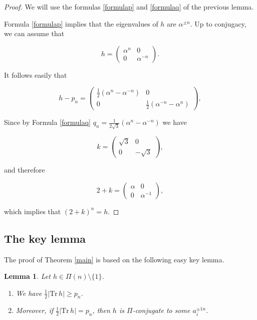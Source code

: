 \documentclass[12pt]{amsart}
\newcommand{\Tr}{{\mathrm {Tr}}}
\newtheorem{lemma}{Lemma}
\begin{document}
\begin{proof}  We will use the formulas 
\ref{formulap}  and \ref{formulaq}  of the previous lemma. 

Formula \ref{formulap} implies that  the eigenvalues of $h$ are $\alpha^{\pm n}$.
Up to conjugacy, we can assume that


$$h=\begin{pmatrix}
\alpha^n & 0\\
0 &\alpha^{-n}
\end{pmatrix}.$$



It follows easily that 

$$h-p_n=\begin{pmatrix}
\frac{1}{2}(\alpha^n-\alpha^{-n}) & 0\\
0 &\frac{1}{2}(\alpha^{-n}-\alpha^n)
\end{pmatrix},$$

Since by Formula \ref{formulaq}
$q_n= \frac{1}{2\sqrt{3}}(\alpha^{n}-\alpha^{-n})$
we have


$$k=\begin{pmatrix}
\sqrt{3} & 0\\
0 &-\sqrt{3}
\end{pmatrix},$$

\noindent and therefore

$$2+k=\begin{pmatrix}
\alpha& 0\\
0 &\alpha^{-1}
\end{pmatrix},$$

\noindent which implies that $(2+k)^n=h$. 
\end{proof}

\subsection{The key lemma}

The proof of Theorem \ref{main} is based on the following
easy key lemma.

\begin{lemma}\label{key} Let $h\in\Pi(n)\setminus\{1\}$.

\begin{enumerate} 
\item[(a)] We have $\frac{1}{2}\vert \Tr\,h\vert \geq p_n$.
\item[(b)]  Moreover, if $\frac{1}{2}\vert \Tr\,h\vert = p_n$,
then  $h$ is $\Pi$-conjugate 
to some $a_i^{\pm1 n}$.
\end{enumerate}
\end{lemma}
\end{document}
